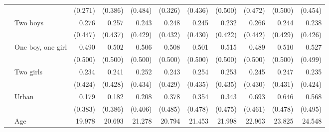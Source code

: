 \documentclass[12pt,letterpaper]{article}
\begin{document}
\begin{table}
\begin{center}
\begin{scriptsize}
\begin{threeparttable}
\begin{tabular} {@{} c l D{.}{.}{1.3} D{.}{.}{1.3} D{.}{.}{1.3} D{.}{.}{1.3} D{.}{.}{1.3} D{.}{.}{1.3} D{.}{.}{1.3} D{.}{.}{1.3} D{.}{.}{1.3} @{}}
                    &                     &     (0.271)         &     (0.386)         &     (0.484)         &     (0.326)         &     (0.436)         &     (0.500)         &     (0.472)         &     (0.500)         &     (0.454)         \\
                    & Two boys            &       0.276         &       0.257         &       0.243         &       0.248         &       0.245         &       0.232         &       0.266         &       0.244         &       0.238         \\
                    &                     &     (0.447)         &     (0.437)         &     (0.429)         &     (0.432)         &     (0.430)         &     (0.422)         &     (0.442)         &     (0.429)         &     (0.426)         \\
                    & One boy, one girl   &       0.490         &       0.502         &       0.506         &       0.508         &       0.501         &       0.515         &       0.489         &       0.510         &       0.527         \\
                    &                     &     (0.500)         &     (0.500)         &     (0.500)         &     (0.500)         &     (0.500)         &     (0.500)         &     (0.500)         &     (0.500)         &     (0.499)         \\
                    & Two girls           &       0.234         &       0.241         &       0.252         &       0.243         &       0.254         &       0.253         &       0.245         &       0.247         &       0.235         \\
                    &                     &     (0.424)         &     (0.428)         &     (0.434)         &     (0.429)         &     (0.435)         &     (0.435)         &     (0.430)         &     (0.431)         &     (0.424)         \\
                    & Urban               &       0.179         &       0.182         &       0.208         &       0.378         &       0.354         &       0.343         &       0.693         &       0.646         &       0.568         \\
                    &                     &     (0.383)         &     (0.386)         &     (0.406)         &     (0.485)         &     (0.478)         &     (0.475)         &     (0.461)         &     (0.478)         &     (0.495)         \\
                    & Age                 &      19.978         &      20.693         &      21.278         &      20.794         &      21.453         &      21.998         &      22.963         &      23.825         &      24.548         \\

\end{tabular}
\end{threeparttable}
\end{scriptsize}
\end{center}
\end{table}
\end{document}
